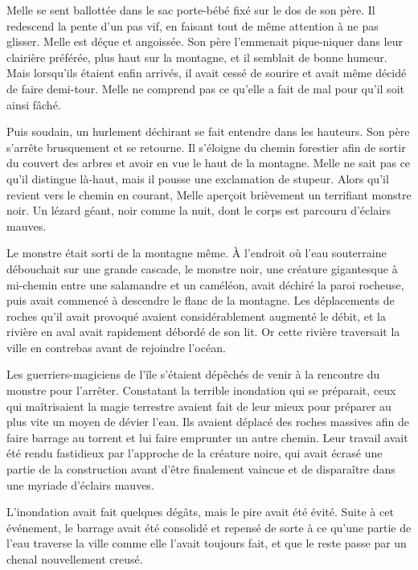 Melle se sent ballottée dans le sac porte-bébé fixé sur le dos de son père. Il redescend la pente d'un pas vif, en faisant tout de même attention à ne pas glisser. Melle est déçue et angoissée. Son père l'emmenait pique-niquer dans leur clairière préférée, plus haut sur la montagne, et il semblait de bonne humeur. Mais lorsqu'ils étaient enfin arrivés, il avait cessé de sourire et avait même décidé de faire demi-tour. Melle ne comprend pas ce qu'elle a fait de mal pour qu'il soit ainsi fâché.

Puis soudain, un hurlement déchirant se fait entendre dans les hauteurs. Son père s'arrête brusquement et se retourne. Il s'éloigne du chemin forestier afin de sortir du couvert des arbres et avoir en vue le haut de la montagne. Melle ne sait pas ce qu'il distingue là-haut, mais il pousse une exclamation de stupeur. Alors qu'il revient vers le chemin en courant, Melle aperçoit brièvement un terrifiant monstre noir. Un lézard géant, noir comme la nuit, dont le corps est parcouru d'éclairs mauves.

\parbr

Le monstre était sorti de la montagne même. À l'endroit où l'eau souterraine débouchait sur une grande cascade, le monstre noir, une créature gigantesque à mi-chemin entre une salamandre et un caméléon, avait déchiré la paroi rocheuse, puis avait commencé à descendre le flanc de la montagne. Les déplacements de roches qu'il avait provoqué avaient considérablement augmenté le débit, et la rivière en aval avait rapidement débordé de son lit. Or cette rivière traversait la ville en contrebas avant de rejoindre l'océan.

Les guerriers-magiciens de l'île s'étaient dépêchés de venir à la rencontre du monstre pour l'arrêter. Constatant la terrible inondation qui se préparait, ceux qui maîtrisaient la magie terrestre avaient fait de leur mieux pour préparer au plus vite un moyen de dévier l'eau. Ils avaient déplacé des roches massives afin de faire barrage au torrent et lui faire emprunter un autre chemin. Leur travail avait été rendu fastidieux par l'approche de la créature noire, qui avait écrasé une partie de la construction avant d'être finalement vaincue et de disparaître dans une myriade d'éclairs mauves.

L'inondation avait fait quelques dégâts, mais le pire avait été évité. Suite à cet événement, le barrage avait été consolidé et repensé de sorte à ce qu'une partie de l'eau traverse la ville comme elle l'avait toujours fait, et que le reste passe par un chenal nouvellement creusé.

